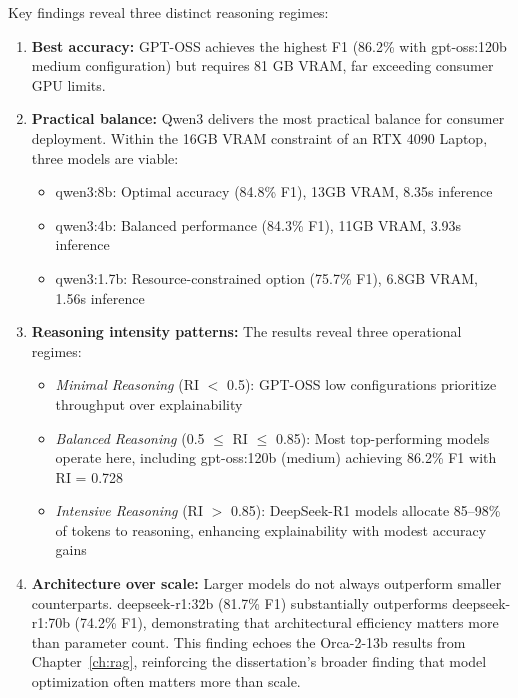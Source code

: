Key findings reveal three distinct reasoning regimes:

\begin{enumerate}[leftmargin=*]
    \item \textbf{Best accuracy:} GPT-OSS achieves the highest F1 (86.2\% with gpt-oss:120b medium configuration) but requires 81 GB VRAM, far exceeding consumer GPU limits.
    
    \item \textbf{Practical balance:} Qwen3 delivers the most practical balance for consumer deployment. Within the 16GB VRAM constraint of an RTX 4090 Laptop, three models are viable:
    \begin{itemize}
        \item qwen3:8b: Optimal accuracy (84.8\% F1), 13GB VRAM, 8.35s inference
        \item qwen3:4b: Balanced performance (84.3\% F1), 11GB VRAM, 3.93s inference
        \item qwen3:1.7b: Resource-constrained option (75.7\% F1), 6.8GB VRAM, 1.56s inference
    \end{itemize}
    
    \item \textbf{Reasoning intensity patterns:} The results reveal three operational regimes:
    \begin{itemize}
        \item \textit{Minimal Reasoning} (RI $<$ 0.5): GPT-OSS low configurations prioritize throughput over explainability
        \item \textit{Balanced Reasoning} (0.5 $\leq$ RI $\leq$ 0.85): Most top-performing models operate here, including gpt-oss:120b (medium) achieving 86.2\% F1 with RI = 0.728
        \item \textit{Intensive Reasoning} (RI $>$ 0.85): DeepSeek-R1 models allocate 85--98\% of tokens to reasoning, enhancing explainability with modest accuracy gains
    \end{itemize}
    
    \item \textbf{Architecture over scale:} Larger models do not always outperform smaller counterparts. deepseek-r1:32b (81.7\% F1) substantially outperforms deepseek-r1:70b (74.2\% F1), demonstrating that architectural efficiency matters more than parameter count. This finding echoes the Orca-2-13b results from Chapter~\ref{ch:rag}, reinforcing the dissertation's broader finding that model optimization often matters more than scale.
\end{enumerate}

